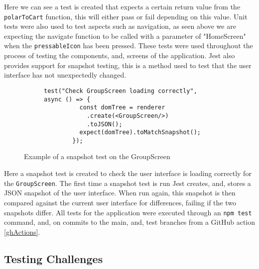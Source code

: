 Here we can see a test is created that expects a certain return value from the \texttt{polarToCart} function, this will either pass or fail depending on this value. Unit tests were also used to test aspects such as navigation, as seen above we are expecting the navigate function to be called with a parameter of "HomeScreen" when the \texttt{pressableIcon} has been pressed. These tests were used throughout the process of testing the components, and, screens of the application. Jest also provides support for snapshot testing, this is a method used to test that the user interface has not unexpectedly changed. 

\begin{figure}[!htbp]
    \centering
    \begin{subfigure}[b]{0.8\textwidth}
        \begin{lstlisting}[language=jsJsx]
        test("Check GroupScreen loading correctly", async () => {
          const domTree = renderer
            .create(<GroupScreen/>)
            .toJSON();
          expect(domTree).toMatchSnapshot();
        });
        \end{lstlisting}
    \end{subfigure}
\caption{Example of a snapshot test on the GroupScreen}
\label{fig:jestSnap}
\end{figure}
\FloatBarrier

Here a snapshot test is created to check the user interface is loading correctly for the \texttt{GroupScreen}. The first time a snapshot test is run Jest creates, and, stores a JSON snapshot of the user interface. When run again, this snapshot is then compared against the current user interface for differences, failing if the two snapshots differ. All tests for the application were executed through an \texttt{npm test} command, and, on commits to the main, and, test branches from a GitHub action \ref{ghActions}.

\subsection{Testing Challenges}

